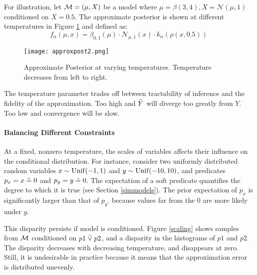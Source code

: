 For illustration, let ${\mathcal{M}} = (\mu, X)$ be a model where $\mu = \beta(3, 4), X = \mathcal{N}(\mu, 1)$  conditioned on $X = 0.5$.
The approximate posterior is shown at different temperatures in Figure \ref{temppost} and defined as:
\begin{equation}\label{approxposterior}
f_\alpha(\mu, x) = \beta_{0,1}(\mu) \cdot \mathcal{N}_{\mu,1}(x) \cdot k_\alpha(\rho(x, 0.5)) 
\end{equation}

\begin{figure}
\centering
\texttt{[image: approxpost2.png]}
\caption{Approximate Posterior at varying temperatures.  Temperature decreases from left to right.}
\label{temppost}
\end{figure}

The temperature parameter trades off between tractability of inference and the fidelity of the approximation.
Too high and $\tilde{Y}$ will diverge too greatly from $Y$. Too low and convergence will be slow.

\paragraph{Balancing Different Constraints}
At a fixed, nonzero temperature, the scales of variables affects their influence on
the conditional distribution.
For instance, consider two uniformly distributed random variables $x \sim \operatorname{Unif}(-1, 1)$ and $y \sim \operatorname{Unif}(-10, 10)$,
and predicates $p_x = x \mathrel{\tilde{=}} 0$ and $p_y = y \mathrel{\tilde{=}} 0$.
The expectation of a soft predicate quantifies the degree to which it is true (see Section \ref{simmodels}).
The prior expectation of $p_x$ is significantly larger than that of $p_y$.
because values far from the 0 are more likely under $y$.

This disparity persists if model is conditioned.
Figure \ref{scaling} shows samples from ${\mathcal{M}}$  conditioned on $p1 \mathrel{\tilde{\lor}} p2$, and a disparity in the histograms of $p1$ and $p2$.
The disparity decreases with decreasing temperature, and disappears at zero.
Still, it is undesirable in practice because it means that the approximation error is distributed unevenly.


